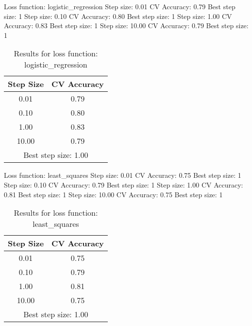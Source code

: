 Loss function: logistic_regression
  Step size:  0.01 CV Accuracy: 0.79
  Best step size: 1
  Step size:  0.10 CV Accuracy: 0.80
  Best step size: 1
  Step size:  1.00 CV Accuracy: 0.83
  Best step size: 1
  Step size: 10.00 CV Accuracy: 0.79
  Best step size: 1

\begin{table}[h]
\centering
\caption{Results for loss function: logistic\_regression}
\begin{tabular}{cc}
\hline
Step Size & CV Accuracy \\
\hline
 0.01 & 0.79 \\
\hline
 0.10 & 0.80 \\
\hline
 1.00 & 0.83 \\
\hline
10.00 & 0.79 \\
\hline
\multicolumn{2}{c}{Best step size:  1.00} \\
\hline
\end{tabular}
\end{table}


Loss function: least_squares
  Step size:  0.01 CV Accuracy: 0.75
  Best step size: 1
  Step size:  0.10 CV Accuracy: 0.79
  Best step size: 1
  Step size:  1.00 CV Accuracy: 0.81
  Best step size: 1
  Step size: 10.00 CV Accuracy: 0.75
  Best step size: 1

\begin{table}[h]
\centering
\caption{Results for loss function: least\_squares}
\begin{tabular}{cc}
\hline
Step Size & CV Accuracy \\
\hline
 0.01 & 0.75 \\
\hline
 0.10 & 0.79 \\
\hline
 1.00 & 0.81 \\
\hline
10.00 & 0.75 \\
\hline
\multicolumn{2}{c}{Best step size:  1.00} \\
\hline
\end{tabular}
\end{table}


